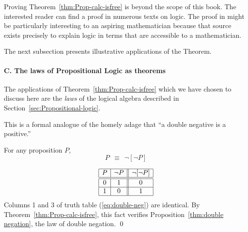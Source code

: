 Proving Theorem~\ref{thm:Prop-calc-isfree} is beyond the scope of this book.  The interested reader can find a proof in numerous texts on logic.  The proof in  \cite{Rosser53} might be particularly interesting to an aspiring mathematician because that source exists precisely to explain logic in terms that are accessible to a mathematician.

\bigskip

The next subsection presents illustrative applications of the Theorem.

\paragraph{C. The laws of Propositional Logic as theorems}

The applications of Theorem~\ref{thm:Prop-calc-isfree} which we have chosen to discuss here are the {\em laws} of the logical algebra described in Section~\ref{sec:Propositional-logic}.

\bigskip



\smallskip

\noindent
This is a formal analogue of the homely adage that ``a double negative is a positive.''

\begin{prop}
\label{thm:double negation}
For any proposition $P$,
\[ P \ \ \equiv \ \ \neg [\neg P] \]
\end{prop}

\begin{equation}
\label{eq:double-neg}
\begin{array}{|c|c||c|}
\hline
P & \neg P & \neg[\neg P] \\
\hline
\hline
0 & 1 & 0 \\
\hline
1 & 0 & 1 \\
\hline
\end{array}
\end{equation}
Columns 1 and 3 of truth table (\ref{eq:double-neg}) are identical.  By Theorem~\ref{thm:Prop-calc-isfree}, this fact verifies Proposition~\ref{thm:double negation}, the law of double negation.  \qed

\bigskip


